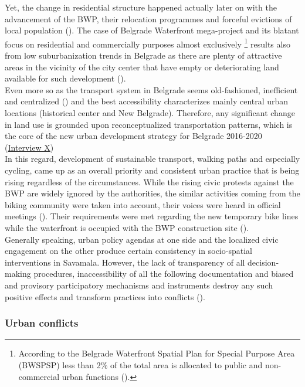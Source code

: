 \documentclass[11pt]{report}
\begin{document}
Yet, the change in residential structure happened actually later on with the advancement of the BWP, their relocation programmes and forceful evictions of local population (\cite{ref media}).
The case of Belgrade Waterfront mega-project and its blatant focus on residential and commercially purposes almost exclusively
\footnote{According to the Belgrade Waterfront Spatial Plan for Special Purpose Area (BWSPSP) less than 2\% of the total area is allocated to public and non-commercial urban functions (\cite{BWPSPSP}).}
results also from low suburbanization trends in Belgrade as there are plenty of attractive areas in the vicinity of the city center that have empty or deteriorating land available for such development (\cite{(Hirt 2009)}).
\\

Even more so as the transport system in Belgrade seems old-fashioned, inefficient and centralized (\cite{Grozdanic2008}) and the best accessibility characterizes mainly central urban locations (historical center and New Belgrade).
Therefore, any significant change in land use is grounded upon reconceptualized transportation patterns, which is the core of the new urban development strategy for Belgrade 2016-2020 (\href{InterviewX}{Interview X})
\\

In this regard, development of sustainable transport, walking paths and especially cycling, came up as an overall priority and consistent urban practice that is being rising regardless of the circumstances.
While the rising civic protests against the BWP are widely ignored by the authorities, the similar activities coming from the biking community were taken into account, their voices were heard in official meetings (\cite{media}).
Their requirements were met regarding the new temporary bike lines while the waterfront is occupied with the BWP construction site (\cite{media}).
\\

Generally speaking, urban policy agendas at one side and the localized civic engagement on the other produce certain consistency in socio-spatial interventions in Savamala.
However, the lack of transparency of all decision-making procedures, inaccessibility of all the following documentation and biased and provisory participatory mechanisms and instruments destroy any such positive effects and transform practices into conflicts (\cite{MinistarstvoProstora2014}).

\subsubsection{Urban conflicts}
\end{document}
